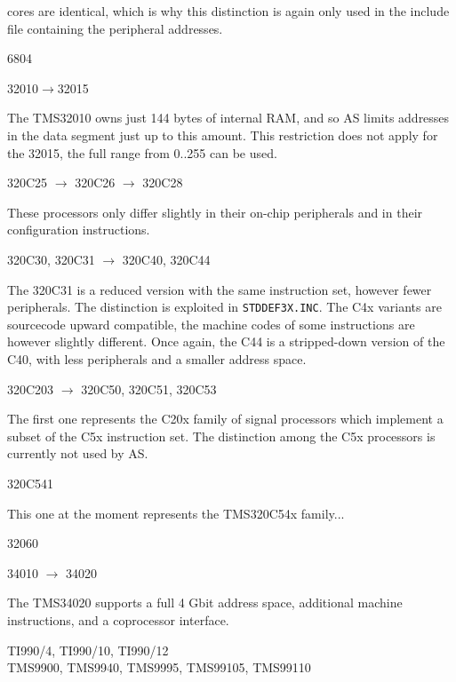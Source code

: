 \documentclass[12pt,twoside]{report}
\newcommand{\tty}[1]{{\tt #1}}
\newcommand{\asname}{{AS}}
\begin{document}
cores are identical, which is why this distinction is again only used
in the include file containing the peripheral addresses.
\begin{cpulist}
   6804
\end{cpulist}
\begin{cpulist}
   32010$\rightarrow$32015
\end{cpulist}
The TMS32010 owns just 144 bytes of internal RAM, and so \asname{} limits
addresses in the data segment just up to this amount.  This restriction
does not apply for the 32015, the full range from 0..255 can be used.
\begin{cpulist}
   320C25 $\rightarrow$ 320C26 $\rightarrow$ 320C28
\end{cpulist}
These processors only differ slightly in their on-chip peripherals
and in their configuration instructions.
\begin{cpulist}
   320C30, 320C31 $\rightarrow$ 320C40, 320C44
\end{cpulist}
The 320C31 is a reduced version with the same instruction set,
however fewer peripherals.  The distinction is exploited in
\tty{STDDEF3X.INC}.  The C4x variants are sourcecode upward
compatible, the machine codes of some instructions are however
slightly different.  Once again, the C44 is a stripped-down
version of the C40, with less peripherals and a smaller address
space.
\begin{cpulist}
   320C203 $\rightarrow$ 320C50, 320C51, 320C53
\end{cpulist}
The first one represents the C20x family of signal processors which
implement a subset of the C5x instruction set.  The distinction among the
C5x processors is currently not used by \asname{}.
\begin{cpulist}
   320C541
\end{cpulist}
This one at the moment represents the TMS320C54x family...
\begin{cpulist}
   32060
\end{cpulist}
\begin{cpulist}
   34010 $\rightarrow$ 34020
\end{cpulist}
The TMS34020 supports a full 4 Gbit address space, additional
machine instructions, and a coprocessor interface.
\begin{cpulist}
   TI990/4, TI990/10, TI990/12 \\
\> TMS9900, TMS9940, TMS9995, TMS99105, TMS99110
\end{cpulist}
\end{document}
